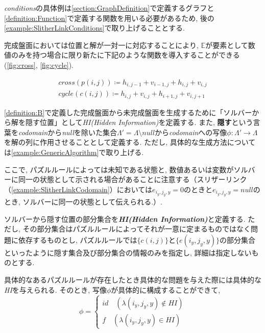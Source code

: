 \textit{conditions}の具体例は\cref{section:GraphDefinition}で定義するグラフと\cref{definition:Function}で定義する関数を用いる必要があるため, 後の\cref{example:SlitherLinkConditions}で取り上げることとする.

完成盤面においては位置と解が一対一に対応することにより, $\mathbb{E}$が要素として数値のみを持つ場合に限り新たに下記のような関数を導入することができる(\cref{fig:cross}, \cref{fig:cycle}).

\begin{definition}\label{definition:Function}
  \begin{gather*}
    \textit{cross}(p(i,j))\coloneqq h_{i,j-1}+v_{i-1,j}+h_{i,j}+v_{i,j} \\
    \textit{cycle}(c(i,j))\coloneqq h_{i,j}+v_{i,j}+h_{i+1,j}+v_{i,j+1}
  \end{gather*}
\end{definition}


\cref{definition:B}で定義した完成盤面から未完成盤面を生成するために「ソルバーから解を隠す位置」として\textit{HI(Hidden Information)}を定義する.
また, \textbf{隠す}という言葉を\textit{codomain}から\textit{null}を除いた集合$\Lambda'=\Lambda \setminus \textit{null}$から\textit{codomain}への写像$\phi\colon \Lambda' \longrightarrow \Lambda$を解の列に作用させることとして定義する.
ただし, 具体的な生成方法については\cref{example:GenericAlgorithm}で取り上げる.


ここで, パズルルールによっては未知である状態と, 数値あるいは変数がソルバーに同一の状態として示される場合があることに注意する（スリザーリンク（\cref{example:SlitherLinkCodomain}）においては$e_{i_y,j_y,y} = 0$のときと$e_{i_y,j_y,y}=\textit{null}$のとき, ソルバーに同一の状態として伝えられる.）.


\begin{definition}\label{definition:HiddenInformation}
  ソルバーから隠す位置の部分集合を\textbf{\textit{HI(Hidden Information)}}と定義する.
  ただし, その部分集合はパズルルールによってそれが一意に定まるものではなく問題に依存するものとし, パズルルールでは$\{c(i,j)\}$と$\{e(i_y,j_y,y)\}$の部分集合といったように隠す集合及び部分集合の情報のみを指定し, 詳細は指定しないものとする.
\end{definition}



具体的なあるパズルルールが存在したとき具体的な問題を与えた際には具体的な\textit{HI}を与えられる. そのとき, 写像$\phi$が具体的に構成することができて,
\begin{equation}\label{equation:Phi}
  \phi=
  \begin{cases}
    {id \quad (\lambda(i_y,j_y,y) \not\in HI)} \\
    {f \quad (\lambda(i_y,j_y,y) \in HI)}
  \end{cases}
\end{equation}

